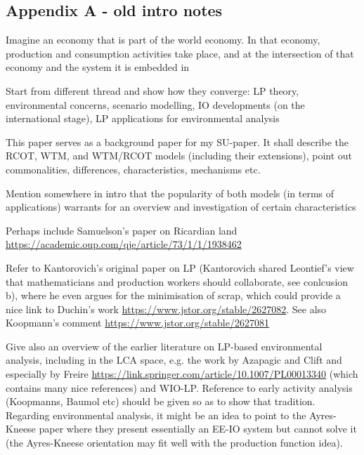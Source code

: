 \documentclass{article}
\begin{document}
\newpage
\setcounter{page}{1}
\renewcommand{\thepage}{A-\arabic{page}}
\linenumbers*
\addappendix

\renewcommand{\thetable}{A.\arabic{table}}
\setcounter{table}{0}
\renewcommand{\theequation}{A.\arabic{equation}}
\setcounter{equation}{0}

\begin{refsection}
\section*{Appendix A - old intro notes}
Imagine an economy that is part of the world economy. In that economy, production and consumption activities take place, and at the intersection of that economy and the system it is embedded in

Start from different thread and show how they converge: LP theory, environmental concerns, scenario modelling, IO developments (on the international stage), LP applications for environmental analysis


This paper serves as a background paper for my SU-paper. It shall describe the RCOT, WTM, and WTM/RCOT models (including their extensions), point out commonalities, differences, characteristics, mechanisms etc.

Mention somewhere in intro that the popularity of both models (in terms of applications) warrants for an overview and investigation of certain characteristics

Perhaps include Samuelson's paper on Ricardian land \url{https://academic.oup.com/qje/article/73/1/1/1938462}

Refer to Kantorovich's original paper on LP (Kantorovich shared Leontief's view that mathematicians and production workers should collaborate, see conlcusion b), where he even argues for the minimisation of scrap, which could provide a nice link to Duchin's work \url{https://www.jstor.org/stable/2627082}. See also Koopmann's comment \url{https://www.jstor.org/stable/2627081}

Give also an overview of the earlier literature on LP-based environmental analysis, including in the LCA space, e.g. the work by Azapagic and Clift and especially by Freire \url{https://link.springer.com/article/10.1007/PL00013340} (which contains many nice references) and WIO-LP. Reference to early activity analysis (Koopmanns, Baumol etc) should be given so as to show that tradition. Regarding environmental analysis, it might be an idea to point to the Ayres-Kneese paper where they present essentially an EE-IO system but cannot solve it (the Ayres-Kneese orientation may fit well with the production function idea).


\end{refsection}
\end{document}
